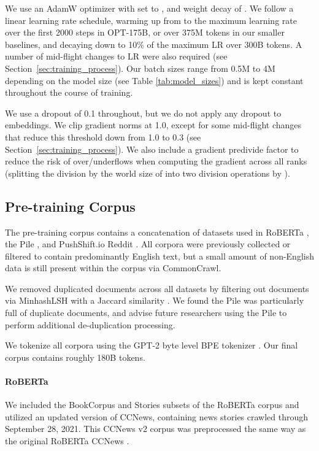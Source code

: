 \documentclass[11pt]{article}
\begin{document}
We use an AdamW optimizer \cite{AdamW} with  set to , and weight decay of .  We follow a linear learning rate schedule, warming up from  to the maximum learning rate over the first 2000 steps in OPT-175B, or over 375M tokens in our smaller baselines, and decaying down to 10\% of the maximum LR over 300B tokens.  A number of mid-flight changes to LR were also required (see Section~\ref{sec:training_process}).  Our batch sizes range from 0.5M to 4M depending on the model size (see Table \ref{tab:model_sizes}) and is kept constant throughout the course of training.

We use a dropout of 0.1 throughout, but we do not apply any dropout to embeddings. We clip gradient norms at 1.0, except for some mid-flight changes that reduce this threshold down from 1.0 to 0.3 (see Section~\ref{sec:training_process}).  We also include a gradient predivide factor to reduce the risk of over/underflows when computing the gradient across all ranks (splitting the division by the world size of  into two division operations by ).

\subsection{Pre-training Corpus}
\label{sec:training_dataset}
The pre-training corpus contains a concatenation of datasets used in RoBERTa \cite{liu2019roberta}, the Pile \cite{thepile}, and PushShift.io Reddit \cite{reddit2020, roller-etal-2021-recipes}. All corpora were previously collected or filtered to contain predominantly English text, but a small amount of non-English data is still present within the corpus via CommonCrawl.

We removed duplicated documents across all datasets by filtering out documents via MinhashLSH \cite{rajaraman2011mining} with a Jaccard similarity . We found the Pile was particularly full of duplicate documents, and advise future researchers using the Pile to perform additional de-duplication processing.

We tokenize all corpora using the GPT-2 byte level BPE tokenizer \cite{sennrich2016bpe,radford2019language,brown2020gpt3}. Our final corpus contains roughly 180B tokens.

\paragraph{RoBERTa} We included the BookCorpus \cite{books2015} and Stories \cite{ccstories2018} subsets of the RoBERTa corpus and utilized an updated version of CCNews, containing news stories crawled through September 28, 2021. This CCNews v2 corpus was preprocessed the same way as the original RoBERTa CCNews \cite{liu2019roberta}.
\end{document}

